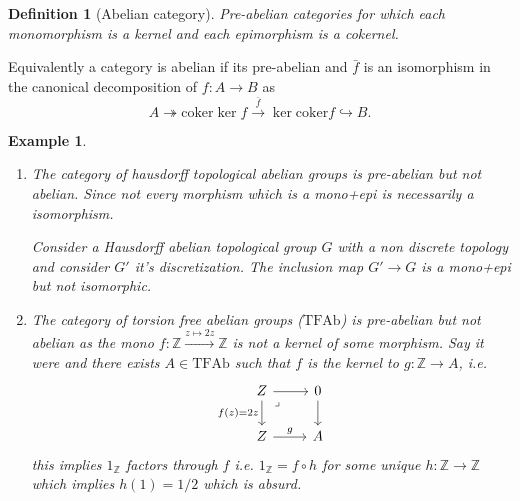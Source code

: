 \documentclass[12pt]{report}
\numberwithin{equation}{section}
\newcommand{\Z}{\mathbb{Z}}
\newcommand{\coker}{{\mathrm{coker}}}
\newtheorem{definition}[dummy]{Definition}
\newtheorem{example}[dummy]{Example}
\begin{document}
	
	\begin{definition}[Abelian category]
		Pre-abelian categories for which each monomorphism is a kernel and each epimorphism is a cokernel.
	\end{definition}
	Equivalently a category is abelian if its pre-abelian and $\bar{f}$ is an isomorphism in the canonical decomposition of $f:A\to B$ as $$A \twoheadrightarrow \coker \ker f \xrightarrow{\bar{f}} \ker \coker f  \hookrightarrow B.$$
	\begin{example}\label{expreabnotab}
		
		\begin{enumerate}Some non examples are:
			\item The category of hausdorff topological abelian groups is pre-abelian but not abelian. Since not every morphism which is a mono+epi is necessarily a isomorphism. 
			
			Consider a Hausdorff abelian topological group $G$ with a non discrete topology and consider $G'$ it's discretization. The inclusion map $G' \to G$ is a mono+epi but not isomorphic. 
			\item The category of torsion free abelian groups ($\mathrm{TFAb}$) is pre-abelian but not abelian as the mono $f: \Z \xrightarrow{z\mapsto 2z} \Z $ is not a kernel of some morphism. Say it were and there exists $ A \in \mathrm{TFAb}$ such that $f$ is the kernel to $ g: \Z \to A$, i.e.
			\[\begin{tikzcd}
				Z & 0 \\
				Z & A
				\arrow[from=1-1, to=1-2]
				\arrow["{f(z)=2z}"', from=1-1, to=2-1]
				\arrow["\lrcorner"{anchor=center, pos=0.125}, draw=none, from=1-1, to=2-2]
				\arrow[from=1-2, to=2-2]
				\arrow["g", from=2-1, to=2-2]
			\end{tikzcd}\]
			 this implies $1_\Z$ factors through $f$ i.e. $1_\Z =f\circ h$ for some unique $h:\Z \to \Z $ which implies $h(1)=1/2$ which is absurd.
		\end{enumerate}
		
	\end{example}
\end{document}
